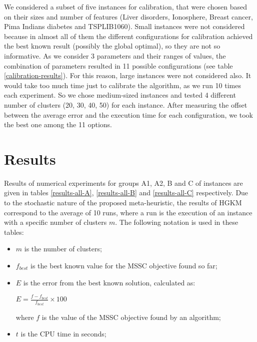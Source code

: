 We considered a subset of five instances for calibration, that were chosen based on their sizes and number of features (Liver disorders, Ionosphere, Breast cancer, Pima Indians diabetes and TSPLIB1060). Small instances were not considered because in almost all of them the different configurations for calibration achieved the best known result (possibly the global optimal), so they are not so informative. As we consider 3 parameters and their ranges of values, the combination of parameters resulted in 11 possible configurations (see table \ref{calibration-results}). For this reason, large instances were not considered also. It would take too much time just to calibrate the algorithm, as we run 10 times each experiment. So we chose medium-sized instances and tested 4 different number of clusters (20, 30, 40, 50) for each instance. After measuring the offset between the average error and the execution time for each configuration, we took the best one among the 11 options.



\section{Results}
\label{sec:results}
Results of numerical experiments for groups A1, A2, B and C of instances are given in tables \ref{results-all-A}, \ref{results-all-B} and \ref{results-all-C} respectively. Due to the stochastic nature of the proposed meta-heuristic, the results of HGKM correspond to the average of 10 runs, where a run is the execution of an instance with a specific number of clusters $m$. The following notation is used in these tables:

\begin{itemize}

	\item $m$ is the number of clusters;

	\item $f_{best}$ is the best known value for the MSSC objective found so far;

	\item $E$ is the error from the best known solution, calculated as:

		\begin{center}
		\large
			$E = \frac{f - f_{best}}{f_{best}} \times 100$
		\end{center}
		
	where $f$ is the value of the MSSC objective found by an algorithm;
	
	\item $t$ is the CPU time in seconds;


\end{itemize}

